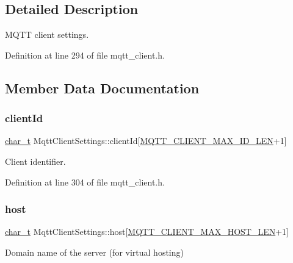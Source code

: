 \subsection{Detailed Description}
M\+Q\+TT client settings. 

Definition at line 294 of file mqtt\+\_\+client.\+h.



\subsection{Member Data Documentation}
\mbox{\label{structMqttClientSettings_a8316f4c900445b52de57fe9f1bcdaedb}} 
\subsubsection{\texorpdfstring{client\+Id}{clientId}}
{\footnotesize\ttfamily \hyperlink{compiler__port_8h_a40bb5262bf908c328fbcfbe5d29d0201}{char\+\_\+t} Mqtt\+Client\+Settings\+::client\+Id\mbox{[}\hyperlink{mqtt__client_8h_ae1cf7417055562d99c68bea4c578494e}{M\+Q\+T\+T\+\_\+\+C\+L\+I\+E\+N\+T\+\_\+\+M\+A\+X\+\_\+\+I\+D\+\_\+\+L\+EN}+1\mbox{]}}



Client identifier. 



Definition at line 304 of file mqtt\+\_\+client.\+h.

\mbox{\label{structMqttClientSettings_a4aaa792316a8e2b6bd7edef2db37894c}} 
\subsubsection{\texorpdfstring{host}{host}}
{\footnotesize\ttfamily \hyperlink{compiler__port_8h_a40bb5262bf908c328fbcfbe5d29d0201}{char\+\_\+t} Mqtt\+Client\+Settings\+::host\mbox{[}\hyperlink{mqtt__client_8h_a2083c689d628c63ee0e4bd2850ce63d1}{M\+Q\+T\+T\+\_\+\+C\+L\+I\+E\+N\+T\+\_\+\+M\+A\+X\+\_\+\+H\+O\+S\+T\+\_\+\+L\+EN}+1\mbox{]}}



Domain name of the server (for virtual hosting) 




